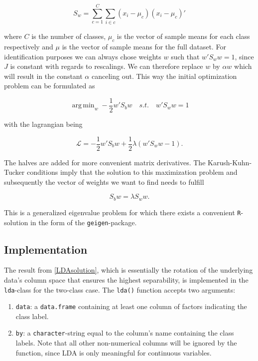 \documentclass{article}
\DeclareMathOperator*{\argmin}{arg\,min}
\begin{document}
\begin{equation}
S_w = \sum_{c=1}^{C}\sum_{i \in c}(x_i - \mu_c)(x_i - \mu_c)\prime
\end{equation} 

where $C$ is the number of classes, $\mu_c$ is the vector of sample means for each class respectively and $\mu$ is the vector of sample means for the full dataset. For identification purposes we can always chose weights $w$ such that $w\prime S_w w = 1$, since $J$ is constant with regards to rescalings. We can therefore replace $w$ by $\alpha w$ which will result in the constant $\alpha$ canceling out. This way the initial optimization problem can be formulated as

\begin{equation}
\argmin_{w} -\frac{1}{2} w\prime S_b w \quad s.t. \quad w \prime S_w w = 1
\end{equation}

with the lagrangian being

\begin{equation}
\mathcal{L} = -\frac{1}{2} w\prime S_b w + \frac{1}{2}\lambda\left(w\prime S_w w - 1\right).
\end{equation}

The halves are added for more convenient matrix derivatives. The Karush-Kuhn-Tucker conditions imply that the solution to this maximization problem and subsequently the vector of weights we want to find needs to fulfill

\begin{equation}
\label{LDAsolution}
S_b w = \lambda S_w w.
\end{equation}

This is a generalized eigenvalue problem for which there exists a convenient \texttt{R}-solution in the form of the \texttt{geigen}-package.

\subsection{Implementation}

The result from \ref{LDAsolution}, which is essentially the rotation of the underlying data's column space that ensures the highest separability, is implemented in the \texttt{lda}-class for the two-class case. The \texttt{lda()} function accepts two arguments:

\begin{enumerate}
\item \texttt{data}: a \texttt{data.frame} containing at least one column of factors indicating the class label.
\item \texttt{by}: a \texttt{character}-string equal to the column's name containing the class labels. Note that all other non-numerical columns will be ignored by the function, since LDA is only meaningful for continuous variables.
\end{enumerate} 
\end{document}
